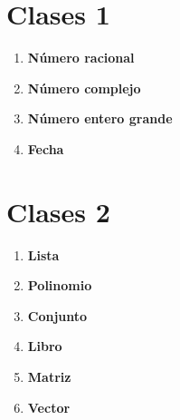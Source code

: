 \section{Clases 1}
\begin{enumerate}
    \item \textbf{Número racional}\\
    

    \item \textbf{Número complejo}\\
    

    \item \textbf{Número entero grande}\\
    

    \item \textbf{Fecha}\\
    
\end{enumerate}

\section{Clases 2}
\begin{enumerate}
    \item \textbf{Lista}\\
    
    
    \item \textbf{Polinomio}\\
    

    \item \textbf{Conjunto}\\
    



    \item \textbf{Libro}\\
    

    \item \textbf{Matriz}\\
    
    
    \item \textbf{Vector}\\
    
\end{enumerate}